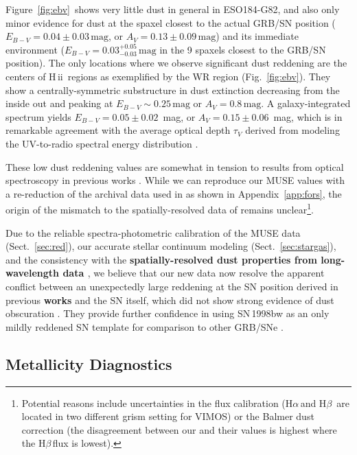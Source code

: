 \documentclass[traditabstract, referee]{aa}
\newcommand{\hb}{H$\beta$}
\newcommand{\ha}{H$\alpha$}
\newcommand{\hii}{\mbox{H\,{\sc ii}}}
\begin{document}
Figure~\ref{fig:ebv}~shows very little dust in general in ESO184-G82, and also only minor evidence for dust at the spaxel closest to the actual GRB/SN position ($E_{B-V} = 0.04\pm0.03\,\mathrm{mag}$, or $A_V = 0.13\pm0.09\,\mathrm{mag}$) and its immediate environment ($E_{B-V} = 0.03_{-0.03}^{+0.05}\,\mathrm{mag}$ in the 9 spaxels closest to the GRB/SN position). The only locations where we observe significant dust reddening are the centers of \hii\, regions as exemplified by the WR region (Fig.~\ref{fig:ebv}). They show a centrally-symmetric substructure in dust extinction decreasing from the inside out and peaking at $E_{B-V} \sim 0.25\,\mathrm{mag}$ or $A_V = 0.8\,\mathrm{mag}$. A galaxy-integrated spectrum yields $E_{B-V} = 0.05\pm0.02$~mag, or $A_V=0.15\pm0.06$~mag, which is in remarkable agreement with the average optical depth $\tau_V$ derived from modeling the UV-to-radio spectral energy distribution \citep{2014A&A...562A..70M}.

These low dust reddening values are somewhat in tension to results from optical spectroscopy in previous works \citep{2006A&A...454..103H, 2008A&A...490...45C}. While we can reproduce our MUSE values with a re-reduction of the archival data used in \citet{2006A&A...454..103H} as shown in Appendix~\ref{app:fors}, the origin of the mismatch to the spatially-resolved data of \citet{2008A&A...490...45C} remains unclear\footnote{Potential reasons include uncertainties in the flux calibration (\ha\,and \hb\, are located in two different grism setting for VIMOS) or the Balmer dust correction (the disagreement between our and their values is highest where the \hb\,flux is lowest).}.

Due to the reliable spectra-photometric calibration of the MUSE data (Sect.~\ref{sec:red}), our accurate stellar continuum modeling (Sect.~\ref{sec:stargas}), and the consistency with the \textbf{spatially-resolved dust properties from long-wavelength data \citep{2014A&A...562A..70M}}, we believe that our new data now resolve the apparent conflict between an unexpectedly large reddening at the SN position derived in previous \textbf{works} and the SN itself, which did not show strong evidence of dust obscuration \citep[e.g.][]{1998Natur.395..672I, 2001ApJ...555..900P}. They provide further confidence in using SN\,1998bw as an only mildly reddened SN template for comparison to other GRB/SNe \citep[e.g.][and references therein]{2004ApJ...609..952Z, 2014A&A...566A.102S, 2016arXiv160606791K}.

\subsection{Metallicity Diagnostics}
\end{document}
